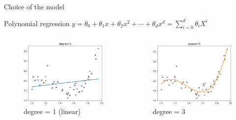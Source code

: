 \documentclass[handout]{beamer}
\begin{document}
\begin{frame}{Choice of the model}
\begin{block}{Polynomial regression}
$y=\theta_0 + \theta_1 x + \theta_2 x^2 + \cdots + \theta_d x^d = \sum_{i=0}^d \theta_i X^i$
\end{block}
\begin{columns}
\pause
    \begin{figure}
    \caption*{degree = 1 (linear)}
    \includegraphics[width=\textwidth]{fig/L1/interp-pol-1.png}
    \end{figure}
\pause
    \begin{figure}
    \caption*{degree = 3 }
    \includegraphics[width=\textwidth]{fig/L1/interp-pol-3.png}

\end{figure}
\end{columns}
\end{frame}
\end{document}
